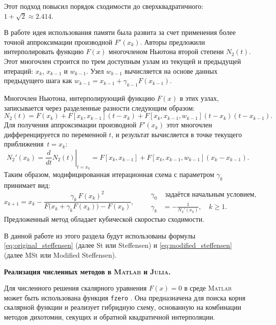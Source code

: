 \documentclass[12pt,a4paper]{article}
\theoremstyle{bigplain}
\theoremstyle{plain}
\begin{document}
\begin{itemize}
Этот подход повысил порядок сходимости до сверхквадратичного: $1 + \sqrt{2} \approx 2.414$.

В работе \cite{Dzunic} идея использования памяти была развита за счет 
применения более точной аппроксимации производной $F'(x_k)$. Авторы
предложили интерполировать функцию $F(x)$ многочленом Ньютона второй
степени $N_2(t)$. Этот многочлен строится по трем доступным узлам
из текущей и предыдущей итераций: $x_k$, $x_{k-1}$ и $w_{k-1}$. Узел
$w_{k-1}$ вычисляется на основе данных предыдущего шага как $w_{k-1} = x_{k-1} + \gamma_{k-1} F(x_{k-1})$.

Многочлен Ньютона, интерполирующий функцию $F(x)$ в этих узлах, записывается
через разделенные разности следующим образом:
\[
N_2(t) = F(x_k) + F[x_k, x_{k-1}](t - x_k) + F[x_k, x_{k-1}, w_{k-1}](t - x_k)(t - x_{k-1}).
\]
Для получения аппроксимации производной $F'(x_k)$ этот многочлен
дифференцируется по переменной $t$, и результат вычисляется в точке текущего приближения~$t = x_k$:
\[
N_2'(x_k) = \left. \frac{d}{dt} N_2(t) \right|_{t=x_k} = F[x_k, x_{k-1}] + F[x_k, x_{k-1}, w_{k-1}](x_k - x_{k-1}).
\]
Таким образом, модифицированная итерационная схема с параметром $\gamma_k$ принимает вид:
\begin{equation}
x_{k+1} = x_k - \frac{\gamma_k\,F(x_k)^2}{F\!\bigl(x_k+\gamma_k F(x_k)\bigr)-F(x_k)},
\qquad
\begin{aligned}
\gamma_0 &\text{ задаётся начальным условием},\\
\gamma_k &= -\frac{1}{N_2'(x_k)}, \quad k\ge 1.
\end{aligned}
\tag{4.3}
\label{eq:modified_steffensen}
\end{equation}
Предложенный метод обладает кубической скоростью сходимости.

В данной работе из этого раздела будут использованы формулы \eqref{eq:original_steffensen} (далее St или Steffensen) и \eqref{eq:modified_steffensen} (далее MSt или Modified Steffensen).
\end{itemize}





\noindent\textbf{Реализация численных методов в \textsc{Matlab} и \textsc{Julia}.}

Для численного решения скалярного уравнения $F(x)=0$
в среде \textsc{Matlab} может быть использована функция \texttt{fzero} \cite{Matlab}.
Она предназначена для поиска корня скалярной функции
и реализует гибридную схему, основанную на комбинации
методов дихотомии, секущих и обратной квадратичной интерполяции.
\end{document}
